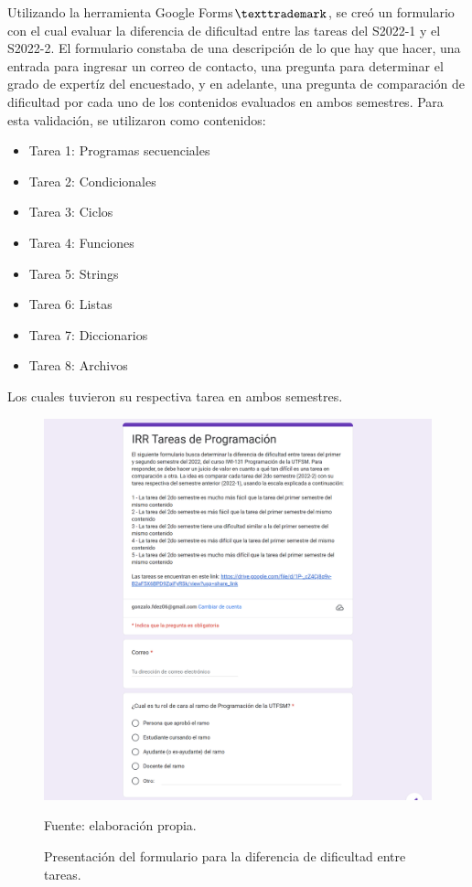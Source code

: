 \documentclass[letterpaper,12pt]{article}
\begin{document}
Utilizando la herramienta Google Forms$\texttrademark$, se creó un formulario con el cual evaluar la diferencia de dificultad entre las tareas del S2022-1 y el S2022-2. El formulario constaba de una descripción de lo que hay que hacer, una entrada para ingresar un correo de contacto, una pregunta para determinar el grado de expertíz del encuestado, y en adelante, una pregunta de comparación de dificultad por cada uno de los contenidos evaluados en ambos semestres. Para esta validación, se utilizaron como contenidos:
\begin{itemize}
  \item Tarea 1: Programas secuenciales
  \item Tarea 2: Condicionales
  \item Tarea 3: Ciclos
  \item Tarea 4: Funciones
  \item Tarea 5: Strings
  \item Tarea 6: Listas
  \item Tarea 7: Diccionarios
  \item Tarea 8: Archivos
\end{itemize}
Los cuales tuvieron su respectiva tarea en ambos semestres.
\begin{figure}[H]
  \centering
  \includegraphics[width=1\textwidth]{figures/formulario1.png}
  \caption{Presentación del formulario para la diferencia de dificultad entre tareas.} Fuente: elaboración propia.
  \label{formulario1}
\end{figure}
\end{document}
